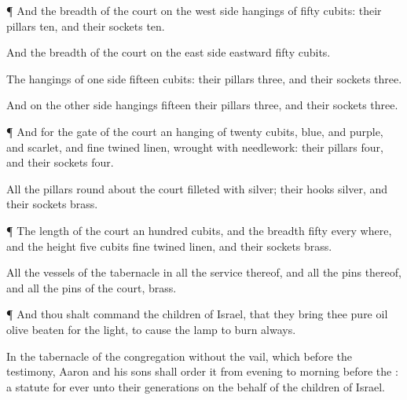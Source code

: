 {\par }{\PP {}¶ And
{} the
breadth of the
court on the
west
side
{}
hangings of
fifty
cubits: their
pillars
ten, and their
sockets
ten.

And the
breadth of the
court on the
east
side
eastward
{}
fifty
cubits.

The
hangings of one
side
{}
fifteen
cubits: their
pillars
three, and their
sockets
three.

And on the
other
side
{}
hangings
fifteen
{} their
pillars
three, and their
sockets
three.


\par }{\PP {}¶ And for the
gate of the
court
{} an
hanging of
twenty
cubits,
{}
blue, and
purple, and
scarlet, and fine
twined
linen, wrought with
needlework:
{} their
pillars
{}
four, and their
sockets
four.

All the
pillars round
about the
court
{}
filleted with
silver; their
hooks
{}
silver, and their
sockets
{}
brass.


\par }{\PP {}¶ The
length of the
court
{} an
hundred
cubits, and the
breadth
fifty every
where, and the
height
five
cubits
{} fine
twined
linen, and their
sockets
{}
brass.

All the
vessels of the
tabernacle in all the
service thereof, and all the
pins thereof, and all the
pins of the
court,
{}
brass.


\par }{\PP {}¶ And thou shalt
command the
children of
Israel, that they
bring thee
pure
oil
olive
beaten for the
light, to cause the
lamp to
burn
always.

In the
tabernacle of the
congregation
without the
vail, which
{} before the
testimony,
Aaron and his
sons shall
order it from
evening to
morning
before the
{}:
{} a
statute for
ever unto their
generations on the behalf of the
children of
Israel.




\par }

